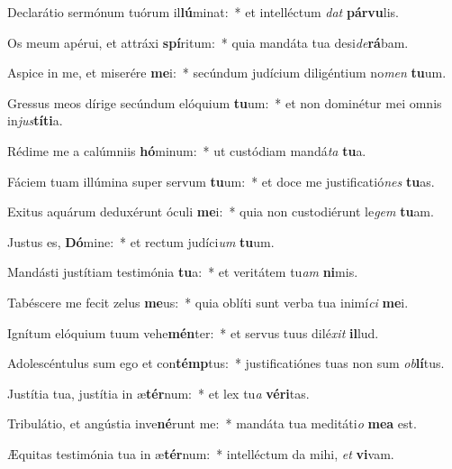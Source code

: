 \item Declarátio sermónum tuórum il\textbf{lú}minat:~* et intelléctum \textit{dat} \textbf{pár}\textbf{vu}lis.
\item Os meum apérui, et attráxi \textbf{spí}ritum:~* quia mandáta tua desi\textit{de}\textbf{rá}bam.
\item Aspice in me, et miserére \textbf{me}i:~* secúndum judícium diligéntium no\textit{men} \textbf{tu}um.
\item Gressus meos dírige secúndum elóquium \textbf{tu}um:~* et non dominétur mei omnis in\textit{jus}\textbf{tí}\textbf{ti}a.
\item Rédime me a calúmniis \textbf{hó}minum:~* ut custódiam mandá\textit{ta} \textbf{tu}a.
\item Fáciem tuam illúmina super servum \textbf{tu}um:~* et doce me justificatió\textit{nes} \textbf{tu}as.
\item Exitus aquárum deduxérunt óculi \textbf{me}i:~* quia non custodiérunt le\textit{gem} \textbf{tu}am.
\item Justus es, \textbf{Dó}mine:~* et rectum judíci\textit{um} \textbf{tu}um.
\item Mandásti justítiam testimónia \textbf{tu}a:~* et veritátem tu\textit{am} \textbf{ni}mis.
\item Tabéscere me fecit zelus \textbf{me}us:~* quia oblíti sunt verba tua inimí\textit{ci} \textbf{me}i.
\item Ignítum elóquium tuum vehe\textbf{mén}ter:~* et servus tuus dilé\textit{xit} \textbf{il}lud.
\item Adolescéntulus sum ego et con\textbf{témp}tus:~* justificatiónes tuas non sum \textit{ob}\textbf{lí}tus.
\item Justítia tua, justítia in æ\textbf{tér}num:~* et lex tu\textit{a} \textbf{vé}\textbf{ri}tas.
\item Tribulátio, et angústia inve\textbf{né}runt me:~* mandáta tua meditáti\textit{o} \textbf{me}\textbf{a} est.
\item Æquitas testimónia tua in æ\textbf{tér}num:~* intelléctum da mihi, \textit{et} \textbf{vi}vam.
